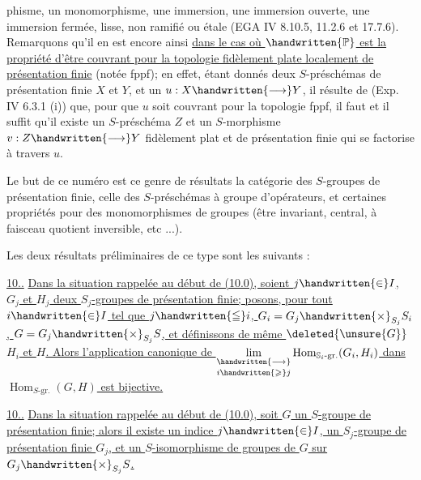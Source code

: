 %
%
phisme, un monomorphisme, une immersion, une immersion ouverte, une immersion fermée, lisse, non ramifié ou étale (EGA IV 8.10.5, 11.2.6 et 17.7.6). Remarquons qu'il en est encore ainsi  \uline{dans le cas où $\handwritten{\mathbb{P}}$ est la propriété d'être couvrant pour la topologie fidèlement plate localement de présentation finie} (notée fppf); en effet, étant donnés deux $S$-préschémas de présentation finie $X$ et $Y$, et un  $u:X\handwritten{\longrightarrow}Y$, il résulte de (Exp. IV 6.3.1 (i))\deleted{,} que, pour que $u$ soit couvrant pour la topologie fppf, il faut et il suffit qu'il existe un $S$-préschéma $Z$ et un $S$-morphisme $v:Z\handwritten{\longrightarrow}Y$ fidèlement plat et de présentation finie qui se factorise à travers $u$.

Le but de ce numéro est  ce genre de résultats  la catégorie des $S$-groupes de présentation finie,  celle des $S$-préschémas à groupe d'opérateurs, et  certaines propriétés pour des monomorphismes de groupes (être invariant, central, à faisceau quotient inversible, etc ...).

Les deux résultats préliminaires de ce type sont les suivants :

\uline{10..}  \uline{Dans la situation rappelée au début de (10.0), soient  $j\handwritten{\in}I$, $G_j$ et $H_j$ deux $S_j$-groupes de présentation finie; posons, pour tout $i\handwritten{\in}I$ tel que $j\handwritten{\leqq}i$, $G_i=G_j\handwritten{\times}_{S_j}S_i$, $G=G_j\handwritten{\times}_{S_j}S$, et définissons de même $\deleted{\unsure{G}}$ $H_i$ et $H$. Alors l'application canonique de $\underset{i\handwritten{\geqslant}j}{\underset{\handwritten{\longrightarrow}}{\lim}}\operatorname{Hom}_{\mathbb{S}_i\text{-gr.}}(G_i,H_i)$ dans $\operatorname{Hom}_{S\text{-gr.}}(G,H)$ est bijective.}

\uline{10..}  \uline{Dans la situation rappelée au début de (10.0), soit $G$ un $S$-groupe de présentation finie; alors il existe un indice $j\handwritten{\in}I$,  un $S_j$-groupe de présentation  finie $G_j$, et un  $S$-isomorphisme de groupes de $G$ sur $G_j\handwritten{\times}_{S_j}S$.}

